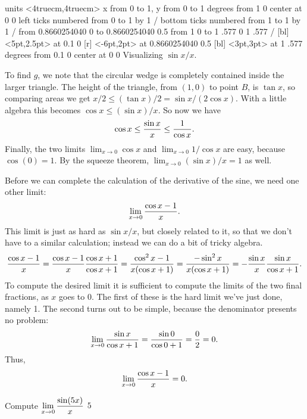 \figure
\texonly
\vbox{\beginpicture
\normalgraphs
\ninepoint
\setcoordinatesystem units <4truecm,4truecm>
\setplotarea x from 0 to 1, y from 0 to 1
 degrees from 1 0 center at 0 0
\axis left ticks numbered from 0 to 1 by 1 /
\axis bottom ticks numbered from 1 to 1 by 1 /
\putrule from  0.8660254040 0 to 0.8660254040 0.5
\putrule from  1 0 to 1 .577
 0 1 .577 /
 [bl] <5pt,2.5pt> at 0.1 0
 [r] <-6pt,2pt> at 0.8660254040 0.5
 [bl] <3pt,3pt> at 1  .577
 degrees from 0.1 0 center at 0 0
\endpicture}
\endtexonly
{}
\begincaption
Visualizing $\sin x / x$.
\endcaption
\endfigure

To find $g$, we note that the circular wedge is completely contained
inside the larger triangle. The height of the triangle, from $(1,0)$
to point $B$, is $\tan x$, so comparing areas we get
$x/2 \le (\tan x)/2 = \sin x / (2\cos x)$. With a little algebra this
becomes $\cos x \le (\sin x)/x$. So now we have 
$$ \cos x \le {\sin x\over x}\le {1\over\cos x}.$$
Finally, the two limits $\lim_{x\to0}\cos x$ and $\lim_{x\to0}1/\cos x$
are easy, because $\cos(0)=1$. By the squeeze theorem,
$\lim_{x\to0} (\sin x)/x = 1$ as well.

Before we can complete the calculation of the derivative of the sine,
we need one other limit:
$$\lim_{x\to0}{\cos x - 1\over x}.$$
This limit is just as hard as $\sin x/x$, but closely related to it,
so that we don't have to a similar calculation; instead we can do a
bit of tricky algebra.
$${\cos x - 1\over x}={\cos x - 1\over x}{\cos x+1\over\cos x+1}
={\cos^2 x - 1\over x(\cos x+1)}={-\sin^2 x\over x(\cos x+1)}=
-{\sin x\over x}{\sin x\over \cos x + 1}.$$
To compute the desired limit it is sufficient to compute the limits of
the two final fractions, as $x$ goes to 0. The first of these is the
hard limit we've just done, namely 1. The second turns out to be
simple, because the denominator presents no problem:
$$\lim_{x\to0}{\sin x\over \cos x + 1}={\sin 0\over \cos 0+1}=
{0\over 2}  = 0.$$
Thus,
$$\lim_{x\to0}{\cos x - 1\over x}=0.$$

\exercises

\twocol

\exercise Compute $\displaystyle\lim_{x\to 0} {\sin (5x)\over x}$
\answer $5$
\endanswer


\endexercise

